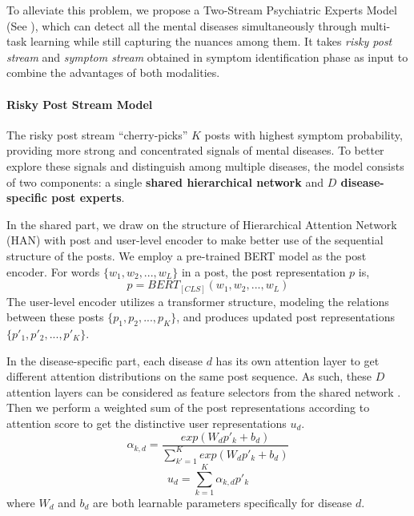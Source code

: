 To alleviate this problem, we propose a Two-Stream Psychiatric Experts Model
(See ), which can detect all the mental diseases simultaneously through multi-task learning while still capturing the nuances among them. 
It takes \textit{risky post stream} and \textit{symptom stream} obtained in symptom identification phase as input to combine the advantages of both modalities. 

\paragraph{Risky Post Stream Model} The risky post stream ``cherry-picks'' $K$ 
posts with highest symptom probability, providing more strong and concentrated signals of mental diseases. 
To better explore these signals and distinguish among multiple diseases, 
the model consists of two components: a single \textbf{shared hierarchical network} and \textbf{$D$ disease-specific post experts}.  

In the shared part, we draw on the structure of Hierarchical Attention Network (HAN) \cite{yang2016hierarchical} with post and user-level encoder to make better use of the sequential structure of the posts.
We employ a pre-trained BERT model as the post encoder. For 
words $\{w_1, w_2, ..., w_L \}$ in a post, the post representation $p$ is,
\begin{equation}
    p = BERT_{[CLS]}(w_1, w_2, ..., w_L)
\end{equation}
The user-level encoder utilizes a transformer \cite{vaswani2017attention} structure, modeling the relations between these posts $\{p_1, p_2, ..., p_K\}$, and produces updated post representations $\{p'_1, p'_2, ..., p'_K\}$.

In the disease-specific part, each disease $d$ has its own attention layer to get different attention distributions on the same post sequence. 
As such, these $D$ attention layers can be considered as feature selectors from the shared network \citep{Liu2019EndToEndML}. 
Then we perform a weighted sum of the post representations according to attention score to get the distinctive user representations $u_d$. 
\begin{equation}
    \alpha_{k, d} = \frac{exp(W_d p'_k + b_d)}{\sum_{k'=1}^{K} exp(W_d p'_k + b_d)}
\end{equation}
\begin{equation}
    u_d = \sum_{k=1}^K \alpha_{k, d} p'_k
\end{equation}
where $W_d$ and $b_d$ are both learnable parameters specifically for disease $d$. 

